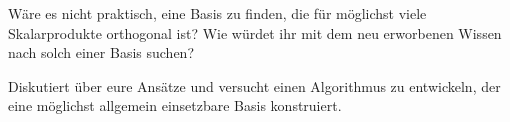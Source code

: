 \begin{centralquestion}
Wäre es nicht praktisch, eine Basis zu finden, die für möglichst viele Skalarprodukte orthogonal ist? Wie würdet ihr mit dem neu erworbenen Wissen nach solch einer Basis suchen? 

Diskutiert über eure Ansätze und versucht einen Algorithmus zu entwickeln, der eine möglichst allgemein einsetzbare Basis konstruiert.
\end{centralquestion}

\pagebreak
